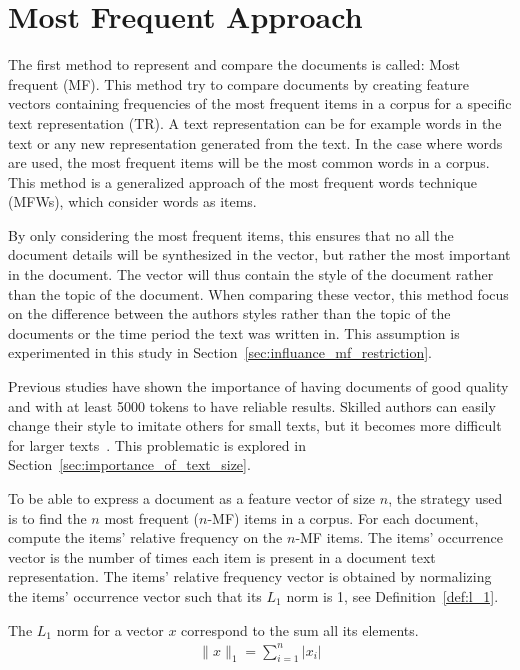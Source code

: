 \section{Most Frequent Approach}

The first method to represent and compare the documents is called: Most frequent (MF).
This method try to compare documents by creating feature vectors containing frequencies of the most frequent items in a corpus for a specific text representation (TR).
A text representation can be for example words in the text or any new representation generated from the text.
In the case where words are used, the most frequent items will be the most common words in a corpus.
This method is a generalized approach of the most frequent words technique (MFWs), which consider words as items.

By only considering the most frequent items, this ensures that no all the document details will be synthesized in the vector, but rather the most important in the document.
The vector will thus contain the style of the document rather than the topic of the document.
When comparing these vector, this method focus on the difference between the authors styles rather than the topic of the documents or the time period the text was written in.
This assumption is experimented in this study in Section~\ref{sec:influance_mf_restriction}.

Previous studies have shown the importance of having documents of good quality and with at least 5000 tokens to have reliable results.
Skilled authors can easily change their style to imitate others for small texts, but it becomes more difficult for larger texts~\cite{savoy_stylo}.
This problematic is explored in Section~\ref{sec:importance_of_text_size}.

To be able to express a document as a feature vector of size $n$, the strategy used is to find the $n$ most frequent ($n$-MF) items in a corpus.
For each document, compute the items' relative frequency on the $n$-MF items.
The items' occurrence vector is the number of times each item is present in a document text representation.
The items' relative frequency vector is obtained by normalizing the items' occurrence vector such that its $L_1$ norm is 1, see Definition~\ref{def:l_1}.

\begin{definition}[$L_1$ norm]
  \label{def:l_1}
  The $L_1$ norm for a vector $x$ correspond to the sum all its elements.
  \begin{gather*}
    \|x\|_{1} = \sum _{i=1}^{n} \left| x_{i} \right|
  \end{gather*}
\end{definition}

